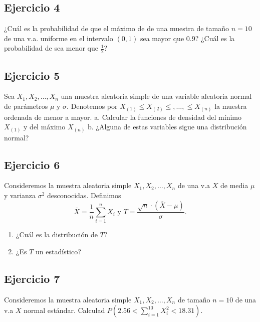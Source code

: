 \documentclass[]{article}
\providecommand{\tightlist}{%
  \setlength{\itemsep}{0pt}\setlength{\parskip}{0pt}}
\begin{document}
\hypertarget{ejercicio-4}{%
\subsection{Ejercicio 4}\label{ejercicio-4}}

¿Cuál es la probabilidad de que el máximo de de una muestra de tamaño
\(n=10\) de una v.a. uniforme en el intervalo \((0,1)\) sea mayor que
\(0.9\)? ¿Cuál es la probabilidad de sea menor que \(\frac12\)?

\hypertarget{ejercicio-5}{%
\subsection{Ejercicio 5}\label{ejercicio-5}}

Sea \(X_1,X_2,\ldots,X_n\) una muestra aleatoria simple de una variable
aleatoria normal de parámetros \(\mu\) y \(\sigma\). Denotemos por
\(X_{(1)}\leq X_{(2)}\leq ,\ldots,\leq X_{(n)}\) la muestra ordenada de
menor a mayor. a. Calcular la funciones de densidad del mínimo
\(X_{(1)}\) y del máximo \(X_{(n)}\) b. ¿Alguna de estas variables sigue
una distribución normal?

\hypertarget{ejercicio-6}{%
\subsection{Ejercicio 6}\label{ejercicio-6}}

Consideremos la muestra aleatoria simple \(X_1,X_2,\ldots,X_n\) de una
v.a \(X\) de media \(\mu\) y varianza \(\sigma^2\) desconocidas.
Definimos
\[\overline{X}=\frac1n \sum\limits_{i=1}^n X_i\mbox{ y } T=\frac{\sqrt{n}\cdot(\overline{X}-\mu)}{\sigma}.\]

\begin{enumerate}
\def\labelenumi{\alph{enumi}.}
\tightlist
\item
  ¿Cuál es la distribución de \(T\)?
\item
  ¿Es \(T\) un estadístico?
\end{enumerate}

\hypertarget{ejercicio-7}{%
\subsection{Ejercicio 7}\label{ejercicio-7}}

Consideremos la muestra aleatoria simple \(X_1,X_2,\ldots,X_n\) de
tamaño \(n=10\) de una v.a \(X\) normal estándar. Calculad
\(P\left(2.56<\sum\limits_{i=1}^{10} X_i^2 <18.31\right)\).
\end{document}
